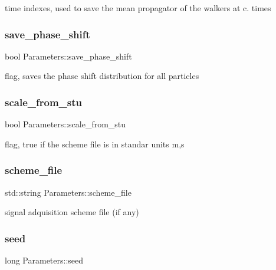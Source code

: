 time indexes, used to save the mean propagator of the walkers at c. times \mbox{\label{class_parameters_ab737ef40d88faa6ee8a701013d9d2984}} 
\subsubsection{\texorpdfstring{save\+\_\+phase\+\_\+shift}{save\_phase\_shift}}
{\footnotesize\ttfamily bool Parameters\+::save\+\_\+phase\+\_\+shift}

flag, saves the phase shift distribution for all particles \mbox{\label{class_parameters_a3c37f738b7700bdc22845bc725d51e6f}} 
\subsubsection{\texorpdfstring{scale\+\_\+from\+\_\+stu}{scale\_from\_stu}}
{\footnotesize\ttfamily bool Parameters\+::scale\+\_\+from\+\_\+stu}

flag, true if the scheme file is in standar units m,s \mbox{\label{class_parameters_afbb7caab773abb16753263a0b04c8a2c}} 
\subsubsection{\texorpdfstring{scheme\+\_\+file}{scheme\_file}}
{\footnotesize\ttfamily std\+::string Parameters\+::scheme\+\_\+file}

signal adquisition scheme file (if any) \mbox{\label{class_parameters_afa076397ed9cbdc4c88215e29b850e3c}} 
\subsubsection{\texorpdfstring{seed}{seed}}
{\footnotesize\ttfamily long Parameters\+::seed}

